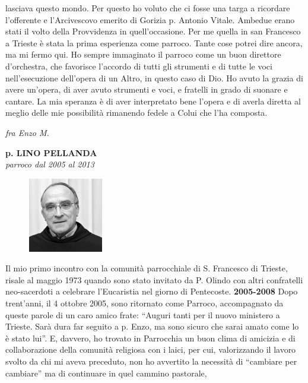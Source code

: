 lasciava questo mondo. Per questo ho voluto che ci fosse una targa a ricordare l’offerente e 
l’Arcivescovo emerito di Gorizia p. Antonio Vitale. Ambedue erano stati il volto della 
Provvidenza in quell’occasione.
\medbreak
Per me quella in san Francesco a Trieste è stata la prima esperienza come parroco. Tante cose 
potrei dire ancora, ma mi fermo qui. Ho sempre immaginato il parroco come un buon direttore 
d’orchestra, che favorisce l’accordo di tutti gli strumenti e di tutte le voci nell’esecuzione 
dell’opera di un Altro, in questo caso di Dio. Ho avuto la grazia di avere un’opera, di aver avuto 
strumenti e voci, e fratelli in grado di suonare e cantare. La mia speranza è di aver interpretato 
bene l’opera e di averla diretta al meglio delle mie possibilità rimanendo fedele a Colui che l’ha 
composta.
\begin{flushright}
\textit{fra Enzo M.}
\end{flushright}
\endgroup
\newpage
\begin{center}
\textbf{\Large p. LINO PELLANDA}\\
	\textit{parroco dal 2005 al 2013}
\end{center}
\bigbreak
\begingroup
\setlength\intextsep{0pt}
\begin{figure}
\centering
\includegraphics[width=0.29\textwidth]{immagini/lino.jpg}
\end{figure}
Il mio primo incontro con la comunità parrocchiale di S. Francesco di Trieste, risale al 
maggio 1973 quando sono stato invitato da P. Olindo con altri confratelli neo-sacerdoti a celebrare 
l'Eucaristia nel giorno di Pentecoste.
\bigbreak
\textbf{2005-2008}
\medbreak
Dopo trent'anni, il 4 ottobre 2005, sono ritornato come Parroco, accompagnato da queste 
parole di un caro amico frate: ``Auguri tanti per il nuovo ministero a Trieste. Sarà dura far seguito a 
p. Enzo, ma sono sicuro che sarai amato come lo è stato lui''.
E, davvero, ho trovato in Parrocchia un buon clima di amicizia e di collaborazione della comunità 
religiosa con i laici, per cui, valorizzando il lavoro svolto da chi mi aveva preceduto, non ho 
avvertito la necessità di “cambiare per cambiare” ma di continuare in quel cammino pastorale, 
